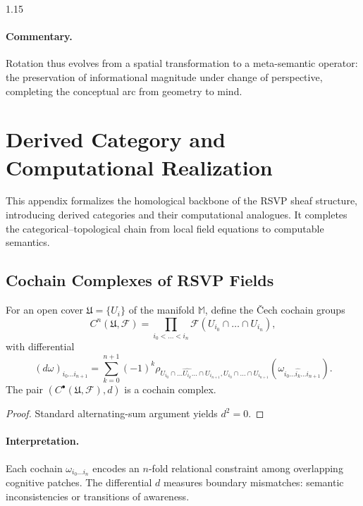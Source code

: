 \documentclass[12pt,a4paper]{article}
\begin{document}
\begin{spacing}{1.15}
\paragraph{Commentary.}
Rotation thus evolves from a spatial transformation to a
meta-semantic operator: the preservation of informational magnitude
under change of perspective, completing the conceptual arc from
geometry to mind.


\section{Derived Category and Computational Realization}
\label{app:derived}

This appendix formalizes the homological backbone of the RSVP sheaf structure,
introducing derived categories and their computational analogues.
It completes the categorical–topological chain from local field equations
to computable semantics.

\subsection{Cochain Complexes of RSVP Fields}

\begin{definition}
\label{def:complex}
For an open cover \(\mathfrak{U}=\{U_i\}\) of the manifold \(\mathbb{M}\),
define the Čech cochain groups
\[
  C^n(\mathfrak{U},\mathscr{F})
   = \prod_{i_0<\dots<i_n}
       \mathscr{F}(U_{i_0}\cap\dots\cap U_{i_n}),
\]
with differential
\[
  (d\omega)_{i_0\dots i_{n+1}}
  = \sum_{k=0}^{n+1} (-1)^k
     \rho_{U_{i_0}\cap\dots\widehat{U_{i_k}}\dots\cap U_{i_{n+1}},
           U_{i_0}\cap\dots\cap U_{i_{n+1}}}
     (\omega_{i_0\dots\widehat{i_k}\dots i_{n+1}}).
\]
The pair \((C^\bullet(\mathfrak{U},\mathscr{F}),d)\)
is a cochain complex.
\end{definition}

\begin{proof}
Standard alternating-sum argument yields \(d^2=0\).
\end{proof}

\paragraph{Interpretation.}
Each cochain \(\omega_{i_0\dots i_n}\) encodes
an \(n\)-fold relational constraint among overlapping cognitive patches.
The differential \(d\) measures boundary mismatches:
semantic inconsistencies or transitions of awareness.


\end{spacing}
\end{document}
